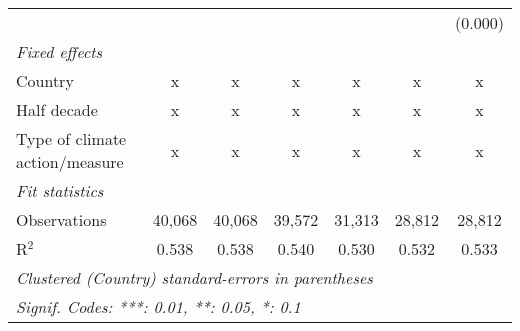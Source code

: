 \begin{tabular}{lcccccc}
                                                                 &         &               &               &              &              & (0.000)\\   
   \emph{Fixed effects}\\
   Country                                                       & x       & x             & x             & x            & x            & x\\  
   Half decade                                                   & x       & x             & x             & x            & x            & x\\  
   Type of climate action/measure                                & x       & x             & x             & x            & x            & x\\  
   \midrule \emph{Fit statistics}\\
   Observations                                                  & 40,068  & 40,068        & 39,572        & 31,313       & 28,812       & 28,812\\  
   R$^2$                                                         & 0.538   & 0.538         & 0.540         & 0.530        & 0.532        & 0.533\\  
   \midrule
   \multicolumn{7}{l}{\emph{Clustered (Country) standard-errors in parentheses}}\\
   \multicolumn{7}{l}{\emph{Signif. Codes: ***: 0.01, **: 0.05, *: 0.1}}\\
\end{tabular}
\par\endgroup


